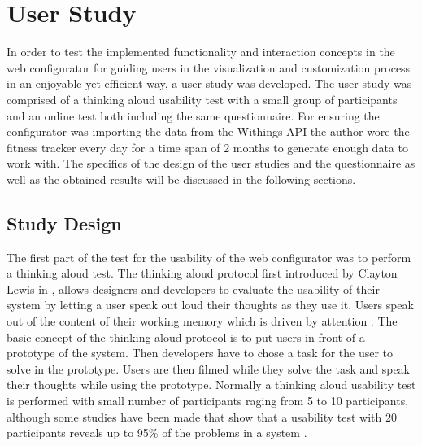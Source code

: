 \documentclass[../medieninformatik-arbeit.tex]{subfiles}
\begin{document}
\section{User Study}
\label{ch:study}
In order to test the implemented functionality and interaction concepts in the web configurator for guiding users in the visualization and customization process in an enjoyable yet efficient way, a user study was developed. The user study was comprised of a thinking aloud usability test with a small group of participants and an online test both including the same questionnaire. For ensuring the configurator was importing the data from the Withings API the author wore the fitness tracker every day for a time span of 2 months to generate enough data to work with. The specifics of the design of the user studies and the questionnaire as well as the obtained results will be discussed in the following sections. 

\subsection{Study Design}
The first part of the test for the usability of the web configurator was to perform a thinking aloud test. The thinking aloud protocol first introduced by Clayton Lewis in \cite{lewis1982using}, allows designers and developers to evaluate the usability of their system by letting a user speak out loud their thoughts as they use it. Users speak out of the content of their working memory which is driven by attention \cite{lewis1993task}. The basic concept of the thinking aloud protocol is to put users in front of a prototype of the system. Then developers have to chose a task for the user to solve in the prototype. Users are then filmed while they solve the task and speak their thoughts while using the prototype. Normally a thinking aloud usability test is performed with small number of participants raging from 5 to 10 participants, although some studies have been made that show that a usability test with 20 participants reveals up to 95\% of the problems in a system \cite{vande2008beyond}. 
\end{document}
